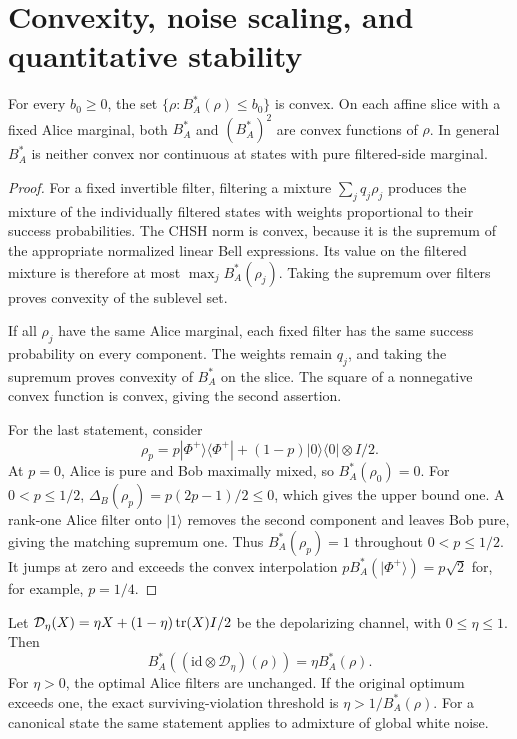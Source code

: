 \section{Convexity, noise scaling, and quantitative stability}
\label{sec:ext-stability}

\begin{proposition}
\label{prop:ext-convexity}
For every $b_0\ge0$, the set $\{\rho:B_A^*(\rho)\le b_0\}$ is convex.
On each affine slice with a fixed Alice marginal, both $B_A^*$ and
$(B_A^*)^2$ are convex functions of $\rho$.
In general $B_A^*$ is neither convex nor continuous at states with
pure filtered-side marginal.
\end{proposition}

\begin{proof}
For a fixed invertible filter, filtering a mixture
$\sum_jq_j\rho_j$ produces the mixture of the individually filtered
states with weights proportional to their success probabilities.
The CHSH norm is convex, because it is the supremum of the appropriate
normalized linear Bell expressions. Its value on the filtered mixture
is therefore at most $\max_j B_A^*(\rho_j)$.
Taking the supremum over filters proves convexity of the sublevel set.

If all $\rho_j$ have the same Alice marginal, each fixed filter has
the same success probability on every component. The weights remain
$q_j$, and taking the supremum proves convexity of $B_A^*$ on the
slice. The square of a nonnegative convex function is convex,
giving the second assertion.

For the last statement, consider
\[
 \rho_p=p|\Phi^+\rangle\langle\Phi^+|
 +(1-p)|0\rangle\langle0|\otimes I/2.
\]
At $p=0$, Alice is pure and Bob maximally mixed, so $B_A^*(\rho_0)=0$.
For $0<p\le1/2$,
$\Delta_B(\rho_p)=p(2p-1)/2\le0$, which gives the upper bound one.
A rank-one Alice filter onto $|1\rangle$ removes the second component
and leaves Bob pure, giving the matching supremum one.
Thus $B_A^*(\rho_p)=1$ throughout $0<p\le1/2$.
It jumps at zero and exceeds the convex interpolation
$pB_A^*(|\Phi^+\rangle)=p\sqrt2$ for, for example, $p=1/4$.
\end{proof}

\begin{proposition}
\label{prop:ext-noise}
Let $\mathcal D_\eta(X)=\eta X+(1-\eta)\operatorname{tr}(X)I/2$ be the
depolarizing channel, with $0\le\eta\le1$. Then
\begin{equation}
 \boxed{
 B_A^*((\mathrm{id}\otimes\mathcal D_\eta)(\rho))
 =\eta B_A^*(\rho).
 }
 \label{eq:ext-noise-scaling}
\end{equation}
For $\eta>0$, the optimal Alice filters are unchanged.
If the original optimum exceeds one, the exact surviving-violation
threshold is $\eta>1/B_A^*(\rho)$.
For a canonical state the same statement applies to admixture of
global white noise.
\end{proposition}

